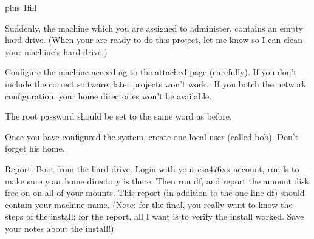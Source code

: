 
\rightskip=0pt plus 1fill

\parindent 0pt

Suddenly, the machine which you are assigned to administer,
contains an empty hard drive.
(When your are ready to do this project,
let me know so I can clean your machine's hard drive.)

Configure the machine according to the attached page (carefully).
If you don't include the correct software, later projects won't work..
If you botch the network configuration, your home directories won't
be available.

The root password should be set to the same word as before.

Once you have configured the system, create one local user (called bob).
Don't forget his home.

Report: Boot from the hard drive.
Login with your csa476xx account, 
run {\ltt{}ls} to make sure your home directory is there.
Then run {\ltt{}df}, and report the amount disk free on 
on all of your mounts.
This report (in addition to the one line df) should contain your machine name.
(Note: for the final, you really want to know the steps of the install;
for the report, all I want is to verify the install worked.
Save your notes about the install!)

\bye
